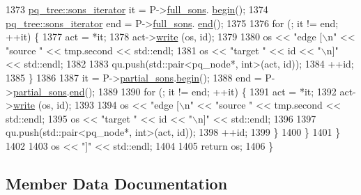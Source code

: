 \begin{DoxyCode}
1373             \mbox{\hyperlink{structsymlist__iterator}{pq\_tree::sons\_iterator}} it = P->\mbox{\hyperlink{classp__node_a09658fb7a7212e51b877444e4cee4378}{full\_sons}}.
      \mbox{\hyperlink{classsymlist_a525b8d44af5d771fe15916372515cce0}{begin}}();
1374             \mbox{\hyperlink{structsymlist__iterator}{pq\_tree::sons\_iterator}} end = P->\mbox{\hyperlink{classp__node_a09658fb7a7212e51b877444e4cee4378}{full\_sons}}.
      \mbox{\hyperlink{classsymlist_a7283589fa01f79d722f8256d7a6a7883}{end}}();
1375 
1376             \textcolor{keywordflow}{for} (; it != end; ++it) \{
1377                 act = *it;
1378                 act->\mbox{\hyperlink{classpq__node_aab7bddb053b6b25b90be00cba7de97f9}{write}} (os, \textcolor{keywordtype}{id});
1379 
1380                 os << \textcolor{stringliteral}{"edge [\(\backslash\)n"} << \textcolor{stringliteral}{"source "} << tmp.second << std::endl;
1381                 os << \textcolor{stringliteral}{"target "} << \textcolor{keywordtype}{id} << \textcolor{stringliteral}{"\(\backslash\)n]"} << std::endl;
1382 
1383                 qu.push(std::pair<pq\_node*, int>(act, \textcolor{keywordtype}{id}));
1384                 ++id;
1385             \}
1386             
1387             it = P->\mbox{\hyperlink{classp__node_a8acc45be68133af1b6a2823875729798}{partial\_sons}}.\mbox{\hyperlink{classsymlist_a525b8d44af5d771fe15916372515cce0}{begin}}();
1388             end = P->\mbox{\hyperlink{classp__node_a8acc45be68133af1b6a2823875729798}{partial\_sons}}.\mbox{\hyperlink{classsymlist_a7283589fa01f79d722f8256d7a6a7883}{end}}();
1389 
1390             \textcolor{keywordflow}{for} (; it != end; ++it) \{
1391                 act = *it;
1392                 act->\mbox{\hyperlink{classpq__node_aab7bddb053b6b25b90be00cba7de97f9}{write}} (os, \textcolor{keywordtype}{id});
1393 
1394                 os << \textcolor{stringliteral}{"edge [\(\backslash\)n"} << \textcolor{stringliteral}{"source "} << tmp.second << std::endl;
1395                 os << \textcolor{stringliteral}{"target "} << \textcolor{keywordtype}{id} << \textcolor{stringliteral}{"\(\backslash\)n]"} << std::endl;
1396 
1397                 qu.push(std::pair<pq\_node*, int>(act, \textcolor{keywordtype}{id}));
1398                 ++id;
1399             \}            
1400         \}
1401     \}
1402     
1403     os << \textcolor{stringliteral}{"]"} << std::endl;
1404     
1405     \textcolor{keywordflow}{return} os;
1406 \}
\end{DoxyCode}


\subsection{Member Data Documentation}
\mbox{\label{classpq__tree_a43bcdb58d91b7e20860f523f49c74fd1}} 
